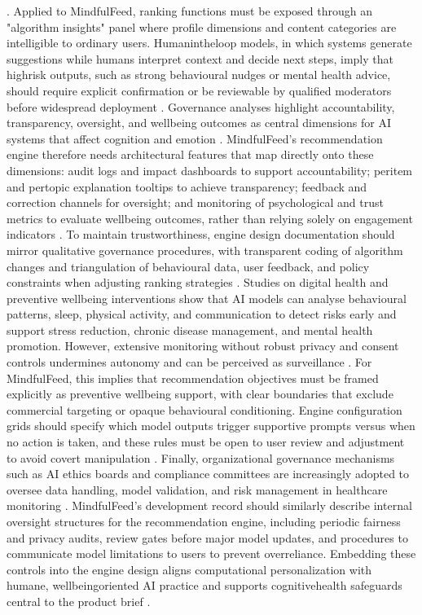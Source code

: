 \documentclass{article}
\begin{document}
\parencites[6]{5375614}. Applied to MindfulFeed, ranking functions must be exposed through an "algorithm insights" panel where profile dimensions and content categories are intelligible to ordinary users. Human\-in\-the\-loop models, in which systems generate suggestions while humans interpret context and decide next steps, imply that high\-risk outputs, such as strong behavioural nudges or mental health advice, should require explicit confirmation or be reviewable by qualified moderators before widespread deployment \parencites[11]{5375614}[5375614]{5375614}. Governance analyses highlight accountability, transparency, oversight, and well\-being outcomes as central dimensions for AI systems that affect cognition and emotion \parencites[8]{7808872}. MindfulFeed's recommendation engine therefore needs architectural features that map directly onto these dimensions: audit logs and impact dashboards to support accountability; per\-item and per\-topic explanation tooltips to achieve transparency; feedback and correction channels for oversight; and monitoring of psychological and trust metrics to evaluate well\-being outcomes, rather than relying solely on engagement indicators \parencites[7]{9300898}[8]{7808872}. To maintain trustworthiness, engine design documentation should mirror qualitative governance procedures, with transparent coding of algorithm changes and triangulation of behavioural data, user feedback, and policy constraints when adjusting ranking strategies \parencites[8]{7808872}. Studies on digital health and preventive well\-being interventions show that AI models can analyse behavioural patterns, sleep, physical activity, and communication to detect risks early and support stress reduction, chronic disease management, and mental health promotion. However, extensive monitoring without robust privacy and consent controls undermines autonomy and can be perceived as surveillance \parencites[7]{9300898}. For MindfulFeed, this implies that recommendation objectives must be framed explicitly as preventive well\-being support, with clear boundaries that exclude commercial targeting or opaque behavioural conditioning. Engine configuration grids should specify which model outputs trigger supportive prompts versus when no action is taken, and these rules must be open to user review and adjustment to avoid covert manipulation \parencites[7]{9300898}[5375614]{5375614}. Finally, organizational governance mechanisms such as AI ethics boards and compliance committees are increasingly adopted to oversee data handling, model validation, and risk management in healthcare monitoring \parencites[18]{8760542}. MindfulFeed's development record should similarly describe internal oversight structures for the recommendation engine, including periodic fairness and privacy audits, review gates before major model updates, and procedures to communicate model limitations to users to prevent overreliance. Embedding these controls into the engine design aligns computational personalization with humane, well\-being\-oriented AI practice and supports cognitive\-health safeguards central to the product brief \parencites[18]{8760542}[7]{9300898}[8]{7808872}.
\end{document}
